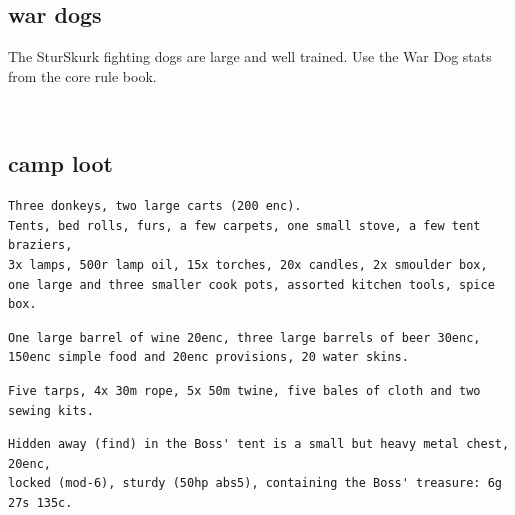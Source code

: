\subsection*{war dogs}

The SturSkurk fighting dogs are large and well trained. Use the War Dog stats from the core rule book.

\


\goodbreak
\subsection*{camp loot}
\small \begin{samepage} \begin{verbatim}
Three donkeys, two large carts (200 enc). 
Tents, bed rolls, furs, a few carpets, one small stove, a few tent braziers,
3x lamps, 500r lamp oil, 15x torches, 20x candles, 2x smoulder box, 
one large and three smaller cook pots, assorted kitchen tools, spice box.
\end{verbatim} \goodbreak \begin{verbatim}
One large barrel of wine 20enc, three large barrels of beer 30enc, 
150enc simple food and 20enc provisions, 20 water skins.
\end{verbatim} \goodbreak \begin{verbatim}
Five tarps, 4x 30m rope, 5x 50m twine, five bales of cloth and two sewing kits.
\end{verbatim} \goodbreak \begin{verbatim}
Hidden away (find) in the Boss' tent is a small but heavy metal chest, 20enc, 
locked (mod-6), sturdy (50hp abs5), containing the Boss' treasure: 6g 27s 135c.
\end{verbatim} \end{samepage} \normalsize

\


























\clearpage
\raggedbottom
